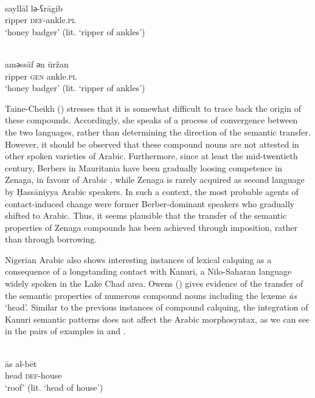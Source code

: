 \documentclass[output=paper]{langsci/langscibook}
\begin{document}
\ea\label{ex:ankle}
\\
\gll   sayllāl lә-ʕrāgib \\
       ripper \textsc{def}-ankle.\textsc{pl}\\
\glt   `honey badger' (lit. ‘ripper of ankles’)

\\
\gll   amәssäf әn ūržan \\
       ripper \textsc{gen} ankle.\textsc{pl} \\
\glt   `honey badger' (lit. ‘ripper of ankles’)
\z
\z

Taine-Cheikh (\citeyear[126]{Taine-Cheikh2008chapter}) stresses that it is somewhat difficult to trace back the origin of these compounds. Accordingly, she speaks of a process of convergence between the two languages, rather than determining the direction of the semantic transfer. However, it should be observed that these compound nouns are not attested in other spoken varieties of Arabic. Furthermore, since at least the mid-twentieth century, Berbers in Mauritania have been gradually loosing competence in Zenaga, in favour of Arabic \citep[100]{Taine-Cheikh2012}, while Zenaga is rarely acquired as second language by Ḥassāniyya Arabic speakers. In such a context, the most probable agents of contact-induced change were former Berber-dominant speakers who gradually shifted to Arabic. Thus, it seems plausible that the transfer of the semantic properties of Zenaga compounds has been achieved through imposition, rather than through borrowing.

Nigerian Arabic also shows interesting instances of lexical calquing as a consequence of a longstanding contact with Kanuri, a Nilo-Saharan language widely spoken in the Lake Chad area. Owens (\citeyear{Owens2015,Owens2016idioms}) gives evidence of the transfer of the semantic properties of numerous compound nouns including the lexeme \textit{{\R}ās} ‘head’. Similar to the previous instances of compound calquing, the integration of Kanuri semantic patterns does not affect the Arabic morphosyntax, as we can see in the  pairs of examples in  and . 

\ea\label{ex:roof}
\\
\gll   {\R}ās al-bēt \\
       head \textsc{def}-house\\
\glt   `roof' (lit. ‘head of house’)
\end{document}
